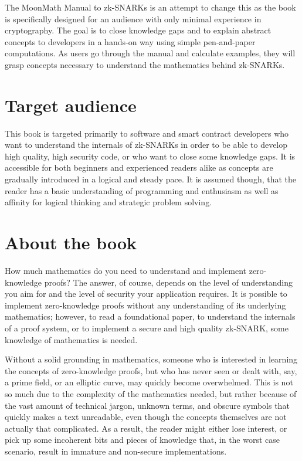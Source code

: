 The MoonMath Manual to zk-SNARKs is an attempt to change this as the book is specifically designed for an audience with only minimal experience in cryptography. The goal is to close knowledge gaps and to explain abstract concepts to developers in a hands-on way using simple pen-and-paper computations. As users go through the manual and calculate examples, they will grasp concepts necessary to understand the mathematics behind zk-SNARKs.

\section{Target audience}
This book is targeted primarily to software and smart contract developers who want to understand the internals of zk-SNARKs in order to be able to develop high quality, high security code, or who want to close some knowledge gaps. It is accessible for both beginners and experienced readers alike as concepts are gradually introduced in a logical and steady pace. It is assumed though, that the reader has a basic understanding of programming and enthusiasm as well as affinity for logical thinking and strategic problem solving.


\section{About the book}
How much mathematics do you need to understand and implement zero-knowledge proofs? The answer, of course, depends on the level of understanding you aim for and the level of security your application requires. It is possible to implement zero-knowledge proofs without any understanding of its underlying mathematics; however, to read a foundational paper, to understand the internals of a proof system, or to implement a secure and high quality zk-SNARK, some knowledge of mathematics is needed. 

Without a solid grounding in mathematics, someone who is interested in learning the concepts of zero-knowledge proofs, but who has never seen or dealt with, say, a prime field, or an elliptic curve, may quickly become overwhelmed. This is not so much due to the complexity of the mathematics needed, but rather because of the vast amount of technical jargon, unknown terms, and obscure symbols that quickly makes a text unreadable, even though the concepts themselves are not actually that complicated. As a result, the reader might either lose interest, or pick up some incoherent bits and pieces of knowledge that, in the worst case scenario, result in immature and non-secure implementations. 

